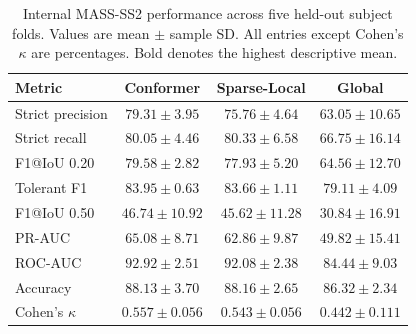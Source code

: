 \begin{table}[!t]
\centering
\caption{Internal MASS-SS2 performance across five held-out subject folds. Values are mean $\pm$ sample SD. All entries except Cohen's $\kappa$ are percentages. Bold denotes the highest descriptive mean.}
\label{tab:mass-main-results}
\footnotesize
\begin{tabular}{lccc}
\toprule
Metric & Conformer & Sparse-Local & Global \\
\midrule
Strict precision & \textbf{$79.31\pm3.95$} & $75.76\pm4.64$ & $63.05\pm10.65$ \\
Strict recall & $80.05\pm4.46$ & \textbf{$80.33\pm6.58$} & $66.75\pm16.14$ \\
F1@IoU 0.20 & \textbf{$79.58\pm2.82$} & $77.93\pm5.20$ & $64.56\pm12.70$ \\
Tolerant F1 & \textbf{$83.95\pm0.63$} & $83.66\pm1.11$ & $79.11\pm4.09$ \\
F1@IoU 0.50 & \textbf{$46.74\pm10.92$} & $45.62\pm11.28$ & $30.84\pm16.91$ \\
PR-AUC & \textbf{$65.08\pm8.71$} & $62.86\pm9.87$ & $49.82\pm15.41$ \\
ROC-AUC & \textbf{$92.92\pm2.51$} & $92.08\pm2.38$ & $84.44\pm9.03$ \\
Accuracy & $88.13\pm3.70$ & \textbf{$88.16\pm2.65$} & $86.32\pm2.34$ \\
Cohen's $\kappa$ & \textbf{$0.557\pm0.056$} & $0.543\pm0.056$ & $0.442\pm0.111$ \\
\bottomrule
\end{tabular}
\end{table}

